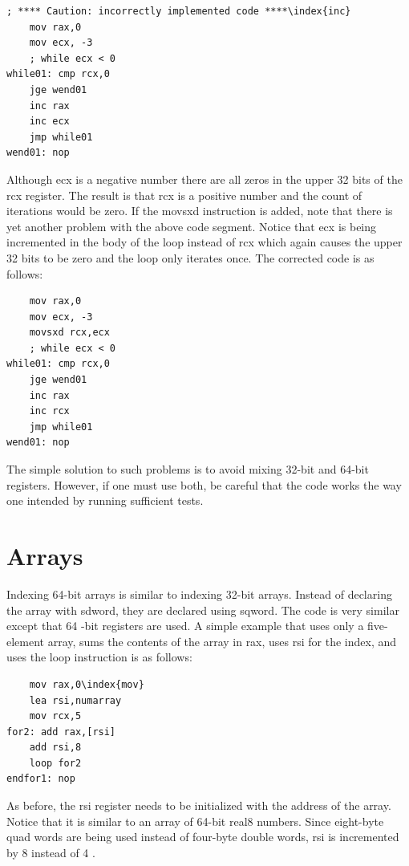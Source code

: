 \documentclass[10pt]{book}
\begin{document}
\begin{verbatim}
; **** Caution: incorrectly implemented code ****\index{inc}
    mov rax,0
    mov ecx, -3
    ; while ecx < 0
while01: cmp rcx,0
    jge wend01
    inc rax
    inc ecx
    jmp while01
wend01: nop
\end{verbatim}

Although ecx is a negative number there are all zeros in the upper 32 bits of the rcx register. The result is that rcx is a positive number and the count of iterations would be zero. If the movsxd instruction is added, note that there is yet another problem with the above code segment. Notice that ecx is being incremented in the body of the loop instead of rcx which again causes the upper 32 bits to be zero and the loop only iterates once. The corrected code is as follows:

\begin{verbatim}
    mov rax,0
    mov ecx, -3
    movsxd rcx,ecx
    ; while ecx < 0
while01: cmp rcx,0
    jge wend01
    inc rax
    inc rcx
    jmp while01
wend01: nop
\end{verbatim}

The simple solution to such problems is to avoid mixing 32-bit and 64-bit registers. However, if one must use both, be careful that the code works the way one intended by running sufficient tests.

\section{Arrays}
Indexing 64-bit arrays is similar to indexing 32-bit arrays. Instead of declaring the array with sdword, they are declared using sqword. The code is very similar except that 64 -bit registers are used. A simple example that uses only a five-element array, sums the contents of the array in rax, uses rsi for the index, and uses the loop instruction is as follows:


\begin{verbatim}
    mov rax,0\index{mov}
    lea rsi,numarray
    mov rcx,5
for2: add rax,[rsi]
    add rsi,8
    loop for2
endfor1: nop
\end{verbatim}

As before, the rsi register needs to be initialized with the address of the array. Notice that it is similar to an array of 64-bit real8 numbers. Since eight-byte quad words are being used instead of four-byte double words, rsi is incremented by 8 instead of 4 .
\end{document}
